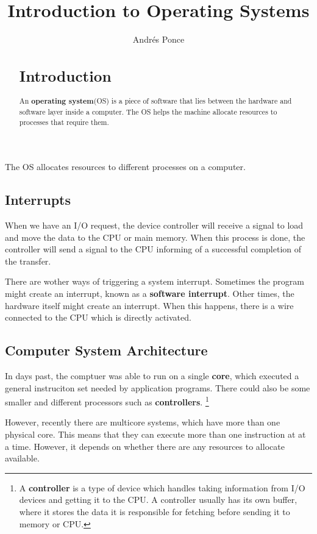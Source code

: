 \documentclass{tufte-handout}
\title{Introduction to Operating Systems}
\author{Andr\'es Ponce}
\begin{document}
\maketitle
\begin{abstract}

\section{Introduction}
An \textbf{operating system}(OS) is a piece of software that lies between the
hardware and software layer inside a computer. 
The OS helps the machine allocate resources to processes that require them.
\end{abstract}

The OS allocates resources to different processes on a computer. 
\subsection{Interrupts}
When we have an I/O request, the device controller will receive a signal to load 
and move the data to the CPU or main memory. When this process is done, the controller
will send a signal to the CPU informing of a successful completion of the transfer.

There are wother ways of triggering a system interrupt. Sometimes the program might
create an interrupt, known as a \textbf{software interrupt}. Other times, the 
hardware itself might create an interrupt. When this happens, there is a wire
connected to the CPU which is directly activated.

\subsection{Computer System Architecture}
In days past, the comptuer was able to run on a single \textbf{core}, which 
executed a general instruciton set needed by application programs. 
There could also be some smaller and different processors such as 
\textbf{controllers}.
\footnote{A \textbf{controller} is a type of device which handles taking information
from I/O devices and getting it to the CPU. A controller usually has its own buffer,
where it stores the data it is responsible for fetching before sending it to memory or 
CPU.}

However, recently there are multicore systems, which have more than one physical core.
This means that they can execute more than one instruction at at a time. 
However, it depends on whether there are any resources to allocate available.
\end{document}
